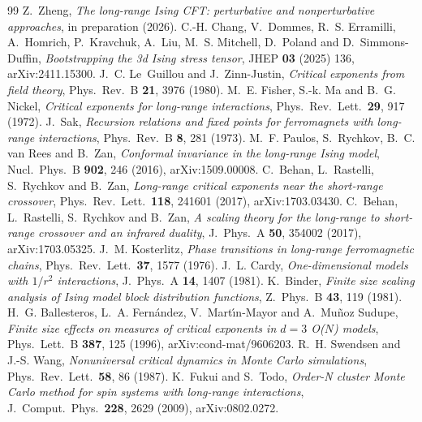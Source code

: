 \begin{thebibliography}{99}\small
{} Z.~Zheng, \emph{The long-range Ising CFT: perturbative and nonperturbative approaches}, in preparation (2026).
 C.-H. Chang, V.~Dommes, R.~S. Erramilli, A.~Homrich, P.~Kravchuk, A.~Liu, M.~S. Mitchell, D.~Poland and
 D.~Simmons-Duffin, \emph{Bootstrapping the 3d Ising stress tensor}, JHEP \textbf{03} (2025) 136, arXiv:2411.15300.
 J.~C. Le~Guillou and J.~Zinn-Justin, \emph{Critical exponents from field theory}, Phys.\ Rev.\ B \textbf{21}, 3976 (1980).
 M.~E. Fisher, S.-k. Ma and B.~G. Nickel, \emph{Critical exponents for long-range interactions}, Phys.\ Rev.\ Lett.\ \textbf{29}, 917 (1972).
 J.~Sak, \emph{Recursion relations and fixed points for ferromagnets with long-range interactions}, Phys.\ Rev.\ B \textbf{8}, 281 (1973).
 M.~F. Paulos, S.~Rychkov, B.~C. van Rees and B.~Zan, \emph{Conformal invariance in the long-range Ising model}, Nucl.\ Phys.\ B \textbf{902}, 246 (2016), arXiv:1509.00008.
 C.~Behan, L.~Rastelli, S.~Rychkov and B.~Zan, \emph{Long-range critical exponents near the short-range crossover}, Phys.\ Rev.\ Lett.\ \textbf{118}, 241601 (2017), arXiv:1703.03430.
 C.~Behan, L.~Rastelli, S.~Rychkov and B.~Zan, \emph{A scaling theory for the long-range to short-range crossover and an infrared duality}, J.\ Phys.\ A \textbf{50}, 354002 (2017), arXiv:1703.05325.
 J.~M. Kosterlitz, \emph{Phase transitions in long-range ferromagnetic chains}, Phys.\ Rev.\ Lett.\ \textbf{37}, 1577 (1976).
 J.~L. Cardy, \emph{One-dimensional models with $1/r^2$ interactions}, J.\ Phys.\ A \textbf{14}, 1407 (1981).
 K.~Binder, \emph{Finite size scaling analysis of Ising model block distribution functions}, Z.\ Phys.\ B \textbf{43}, 119 (1981).
 H.~G. Ballesteros, L.~A. Fern\'andez, V.~Mart\'{\i}n-Mayor and A.~Mu\~noz Sudupe, \emph{Finite size effects on measures of critical exponents in $d=3$ O($N$) models}, Phys.\ Lett.\ B \textbf{387}, 125 (1996), arXiv:cond-mat/9606203.
 R.~H. Swendsen and J.-S. Wang, \emph{Nonuniversal critical dynamics in Monte Carlo simulations}, Phys.\ Rev.\ Lett.\ \textbf{58}, 86 (1987).
 K.~Fukui and S.~Todo, \emph{Order-N cluster Monte Carlo method for spin systems with long-range interactions}, J.\ Comput.\ Phys.\ \textbf{228}, 2629 (2009), arXiv:0802.0272.

\end{thebibliography}

